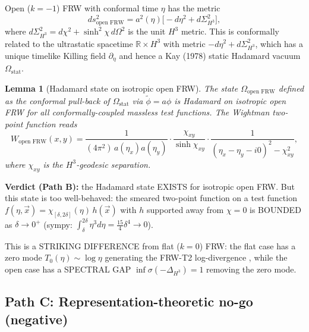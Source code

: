 \documentclass[11pt,a4paper]{article}
\newtheorem{lemma}[theorem]{Lemma}
\theoremstyle{definition}
\newcommand{\R}{\mathbb{R}}
\begin{document}
Open ($k=-1$) FRW with conformal time $\eta$ has the metric
\begin{equation}
  ds^2_{\text{open FRW}} = a^2(\eta)\bigl[-d\eta^2 + d\Sigma_{H^3}^2\bigr],
\end{equation}
where $d\Sigma_{H^3}^2 = d\chi^2 + \sinh^2\chi\,d\Omega^2$ is the unit
$H^3$ metric. This is conformally related to the ultrastatic spacetime
$\R\times H^3$ with metric $-d\eta^2 + d\Sigma_{H^3}^2$, which has a
unique timelike Killing field $\partial_\eta$ and hence a Kay (1978)
\cite{Kay1978} static Hadamard vacuum $\Omega_{\text{stat}}$.

\begin{lemma}[Hadamard state on isotropic open FRW]\label{lem:open-FRW}
The state $\Omega_{\text{open FRW}}$ defined as the conformal pull-back
of $\Omega_{\text{stat}}$ via $\tilde\phi=a\phi$ is Hadamard on
isotropic open FRW for all conformally-coupled massless test functions.
The Wightman two-point function reads
\begin{equation}
  W_{\text{open FRW}}(x,y) = \frac{1}{(4\pi^2)\,a(\eta_x)a(\eta_y)}\cdot
   \frac{\chi_{xy}}{\sinh\chi_{xy}}\cdot
   \frac{1}{(\eta_x-\eta_y-i 0)^2 - \chi_{xy}^2},
\end{equation}
where $\chi_{xy}$ is the $H^3$-geodesic separation.
\end{lemma}

\textbf{Verdict (Path B):} the Hadamard state EXISTS for isotropic open
FRW. But this state is too well-behaved: the smeared two-point function
on a test function $f(\eta,\vec x)=\chi_{[\delta,2\delta]}(\eta)\,h(\vec x)$
with $h$ supported away from $\chi=0$ is BOUNDED as $\delta\to 0^+$
(sympy: $\int_\delta^{2\delta}\eta^3 d\eta = \tfrac{15}{4}\delta^4 \to 0$).

This is a STRIKING DIFFERENCE from flat ($k=0$) FRW: the flat case has
a zero mode $T_0(\eta)\sim\log\eta$ generating the FRW-T2 log-divergence
\cite[Eq.~(20)]{Remondiere2026FRW}, while the open case has a SPECTRAL
GAP $\inf\sigma(-\Delta_{H^3})=1$ removing the zero mode.

\subsection*{Path C: Representation-theoretic no-go (negative)}
\end{document}
